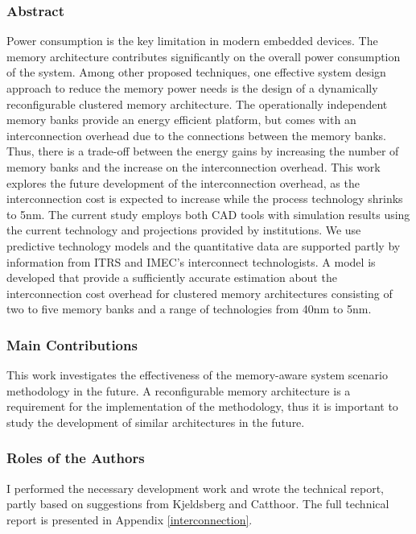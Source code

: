 \subsubsection{Abstract}
Power consumption is the key limitation in modern embedded devices.
The memory architecture contributes significantly on the overall power consumption of the system.
Among other proposed techniques, one effective system design approach to reduce the memory power needs is the design of a dynamically reconfigurable clustered memory architecture.
The operationally independent memory banks provide an energy efficient platform, but comes with an interconnection overhead due to the connections between the memory banks. 
Thus, there is a trade-off between the energy gains by increasing the number of memory banks and the increase on the interconnection overhead.
This work explores the future development of the interconnection overhead, as the interconnection cost is expected to increase while the process technology shrinks to 5nm.
The current study employs both CAD tools with simulation results using the current technology and projections provided by institutions.
We use predictive technology models and the quantitative data are supported partly by information
from ITRS and IMEC's interconnect technologists.
A model is developed that provide a sufficiently accurate estimation about the interconnection cost overhead for clustered memory architectures consisting of two to five memory banks and a range of technologies from 40nm to 5nm.  

\subsubsection{Main Contributions}

This work investigates the effectiveness of the memory-aware system scenario methodology in the future.
A reconfigurable memory architecture is a requirement for the implementation of the methodology, thus it is important to study the development of similar architectures in the future. 

\subsubsection{Roles of the Authors}

I performed the necessary development work and wrote the technical report, partly based on suggestions from Kjeldsberg and Catthoor. 
The full technical report is presented in Appendix \ref{interconnection}.

